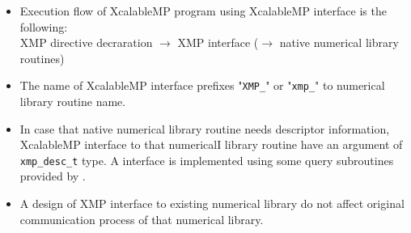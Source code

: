 \begin{itemize}
\item Execution flow of XcalableMP program using XcalableMP interface is the following:\\
      XMP directive decraration $\to$ XMP interface ($\to$ native numerical library routines)
\item The name of XcalableMP interface prefixes "{\tt XMP\_}" or "{\tt xmp\_}" 
      to numerical library routine name.
\item In case that native numerical library routine needs descriptor information,
      XcalableMP interface to that numericalI library routine have an argument of 
      {\tt xmp\_desc\_t} type. A {\XMP} interface is implemented using some 
      query subroutines provided by {\XMP}.
\item A design of XMP interface to existing numerical library do not affect 
      original communication process of that numerical library.
\end{itemize}

